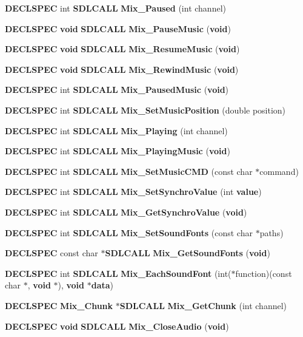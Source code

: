 \begin{DoxyCompactItemize}
\item 
{\bf D\+E\+C\+L\+S\+P\+E\+C} int {\bf S\+D\+L\+C\+A\+L\+L} {\bf Mix\+\_\+\+Paused} (int channel)
\item 
{\bf D\+E\+C\+L\+S\+P\+E\+C} {\bf void} {\bf S\+D\+L\+C\+A\+L\+L} {\bf Mix\+\_\+\+Pause\+Music} ({\bf void})
\item 
{\bf D\+E\+C\+L\+S\+P\+E\+C} {\bf void} {\bf S\+D\+L\+C\+A\+L\+L} {\bf Mix\+\_\+\+Resume\+Music} ({\bf void})
\item 
{\bf D\+E\+C\+L\+S\+P\+E\+C} {\bf void} {\bf S\+D\+L\+C\+A\+L\+L} {\bf Mix\+\_\+\+Rewind\+Music} ({\bf void})
\item 
{\bf D\+E\+C\+L\+S\+P\+E\+C} int {\bf S\+D\+L\+C\+A\+L\+L} {\bf Mix\+\_\+\+Paused\+Music} ({\bf void})
\item 
{\bf D\+E\+C\+L\+S\+P\+E\+C} int {\bf S\+D\+L\+C\+A\+L\+L} {\bf Mix\+\_\+\+Set\+Music\+Position} (double position)
\item 
{\bf D\+E\+C\+L\+S\+P\+E\+C} int {\bf S\+D\+L\+C\+A\+L\+L} {\bf Mix\+\_\+\+Playing} (int channel)
\item 
{\bf D\+E\+C\+L\+S\+P\+E\+C} int {\bf S\+D\+L\+C\+A\+L\+L} {\bf Mix\+\_\+\+Playing\+Music} ({\bf void})
\item 
{\bf D\+E\+C\+L\+S\+P\+E\+C} int {\bf S\+D\+L\+C\+A\+L\+L} {\bf Mix\+\_\+\+Set\+Music\+C\+M\+D} (const char $\ast$command)
\item 
{\bf D\+E\+C\+L\+S\+P\+E\+C} int {\bf S\+D\+L\+C\+A\+L\+L} {\bf Mix\+\_\+\+Set\+Synchro\+Value} (int {\bf value})
\item 
{\bf D\+E\+C\+L\+S\+P\+E\+C} int {\bf S\+D\+L\+C\+A\+L\+L} {\bf Mix\+\_\+\+Get\+Synchro\+Value} ({\bf void})
\item 
{\bf D\+E\+C\+L\+S\+P\+E\+C} int {\bf S\+D\+L\+C\+A\+L\+L} {\bf Mix\+\_\+\+Set\+Sound\+Fonts} (const char $\ast$paths)
\item 
{\bf D\+E\+C\+L\+S\+P\+E\+C} const char $\ast${\bf S\+D\+L\+C\+A\+L\+L} {\bf Mix\+\_\+\+Get\+Sound\+Fonts} ({\bf void})
\item 
{\bf D\+E\+C\+L\+S\+P\+E\+C} int {\bf S\+D\+L\+C\+A\+L\+L} {\bf Mix\+\_\+\+Each\+Sound\+Font} (int($\ast$function)(const char $\ast$, {\bf void} $\ast$), {\bf void} $\ast${\bf data})
\item 
{\bf D\+E\+C\+L\+S\+P\+E\+C} {\bf Mix\+\_\+\+Chunk} $\ast${\bf S\+D\+L\+C\+A\+L\+L} {\bf Mix\+\_\+\+Get\+Chunk} (int channel)
\item 
{\bf D\+E\+C\+L\+S\+P\+E\+C} {\bf void} {\bf S\+D\+L\+C\+A\+L\+L} {\bf Mix\+\_\+\+Close\+Audio} ({\bf void})
\end{DoxyCompactItemize}


